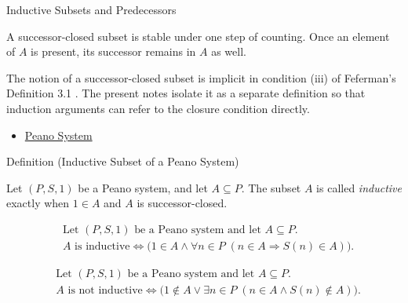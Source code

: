 \begin{topicbox}{Inductive Subsets and Predecessors}
\begin{remark*}[Interpretation]
A successor-closed subset is stable under one step of counting. Once an
element of $A$ is present, its successor remains in $A$ as well.
\end{remark*}

\begin{remark*}
The notion of a successor-closed subset is implicit in condition (iii) of
Feferman's Definition 3.1 \citep{FefermanNumberSystems1964}. The present notes
isolate it as a separate definition so that induction arguments can refer to
the closure condition directly.
\end{remark*}

\begin{dependencies}
\begin{itemize}
  \item \hyperref[def:peano-system]{Peano System}
\end{itemize}
\end{dependencies}

\begin{definitionbox}{Definition (Inductive Subset of a Peano System)}
\begin{definition}
\label{def:inductive-subset-of-peano-system}
Let $(P,S,1)$ be a Peano system, and let $A \subseteq P$. The subset $A$ is
called \emph{inductive} exactly when $1 \in A$ and $A$ is successor-closed.
\end{definition}
\end{definitionbox}

\begin{remark*}
\[
\begin{aligned}
&\text{Let } (P,S,1) \text{ be a Peano system and let } A \subseteq P.\\
&A \text{ is inductive}
\Longleftrightarrow
\bigl(1 \in A \land
\forall n \in P\;(n \in A \Longrightarrow S(n) \in A)\bigr).
\end{aligned}
\]
\end{remark*}

\begin{remark*}
\[
\begin{aligned}
&\text{Let } (P,S,1) \text{ be a Peano system and let } A \subseteq P.\\
&A \text{ is not inductive}
\Longleftrightarrow
\bigl(1 \notin A \lor \exists n \in P\;(n \in A \land S(n) \notin A)\bigr).
\end{aligned}
\]
\end{remark*}


\end{topicbox}
